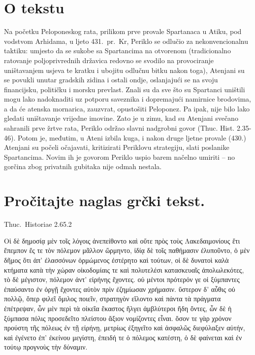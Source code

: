 

\section*{O tekstu}

Na početku Peloponeskog rata, prilikom prve provale Spartanaca u Atiku, pod vodstvom Arhidama, u ljeto 431.\ pr.~Kr, Periklo se odlučio za nekonvencionalnu taktiku: umjesto da se sukobe sa Spartancima na otvorenom (tradicionalno ratovanje poljoprivrednih državica redovno se svodilo na provociranje uništavanjem usjeva te kratku i ubojitu odlučnu bitku nakon toga), Atenjani su se povukli unutar gradskih zidina i ostali ondje, oslanjajući se na svoju financijsku, političku i morsku prevlast. Znali su da sve što su Spartanci uništili mogu lako nadoknaditi uz potporu saveznika i dopremajući namirnice brodovima, a da će atenska mornarica, zauzvrat, opustošiti Peloponez. Pa ipak, nije bilo lako gledati uništavanje vrijedne imovine. Zato je u zimu, kad su Atenjani svečano sahranili prve žrtve rata, Periklo održao slavni nadgrobni govor (Thuc. Hist. 2.35-46). Potom je, međutim, u Ateni izbila kuga, i nakon druge ljetne provale (430.) Atenjani su počeli očajavati, kritizirati Periklovu strategiju, slati poslanike Spartancima. Novim ih je govorom Periklo uspio barem načelno umiriti – no gorčina zbog privatnih gubitaka nije odmah nestala.


\section*{Pročitajte naglas grčki tekst.}

Thuc.\ Historiae 2.65.2


\medskip

\begin{greek}
{\large
{ \noindent Oἱ δὲ δημοσίᾳ μὲν τοῖς λόγοις ἀνεπείθοντο καὶ οὔτε πρὸς τοὺς Λακεδαιμονίους ἔτι ἔπεμπον ἔς τε τὸν πόλεμον μᾶλλον ὥρμηντο, ἰδίᾳ δὲ τοῖς παθήμασιν ἐλυποῦντο, ὁ μὲν δῆμος ὅτι ἀπ' ἐλασσόνων ὁρμώμενος ἐστέρητο καὶ τούτων, οἱ δὲ δυνατοὶ καλὰ κτήματα κατὰ τὴν χώραν οἰκοδομίαις τε καὶ πολυτελέσι κατασκευαῖς ἀπολωλεκότες, τὸ δὲ μέγιστον, πόλεμον ἀντ' εἰρήνης ἔχοντες. οὐ μέντοι πρότερόν γε οἱ ξύμπαντες ἐπαύσαντο ἐν ὀργῇ ἔχοντες αὐτὸν πρὶν ἐζημίωσαν χρήμασιν. ὕστερον δ' αὖθις οὐ πολλῷ, ὅπερ φιλεῖ ὅμιλος ποιεῖν, στρατηγὸν εἵλοντο καὶ πάντα τὰ πράγματα ἐπέτρεψαν, ὧν μὲν περὶ τὰ οἰκεῖα ἕκαστος ἤλγει ἀμβλύτεροι ἤδη ὄντες, ὧν δὲ ἡ ξύμπασα πόλις προσεδεῖτο πλείστου ἄξιον νομίζοντες εἶναι. ὅσον τε γὰρ χρόνον προύστη τῆς πόλεως ἐν τῇ εἰρήνῃ, μετρίως ἐξηγεῖτο καὶ ἀσφαλῶς διεφύλαξεν αὐτήν, καὶ ἐγένετο ἐπ' ἐκείνου μεγίστη, ἐπειδή τε ὁ πόλεμος κατέστη, ὁ δὲ φαίνεται καὶ ἐν τούτῳ προγνοὺς τὴν δύναμιν.

}
}
\end{greek}


